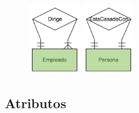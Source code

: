 \documentclass[12pt, fleqn]{report}                             %
\begin{document}
                    \begin{figure}[h]
                        \includegraphics[width=0.20\textwidth]{RelacionUnaria}
                        \includegraphics[width=0.20\textwidth]{RelacionUnaria2}
                    \end{figure}


            \clearpage
            \subsection{Atributos}
\end{document}
